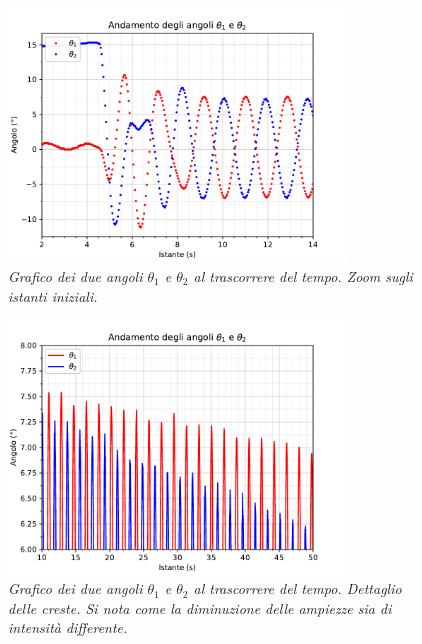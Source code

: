 \documentclass[11pt, a4paper, twoside, italian]{article}
\begin{document}
\begin{figure}[h!]
  \centering
  \includegraphics[width=0.8\textwidth]{../../media/plot/angles_accurate.pdf}
  \caption{\textit{Grafico dei due angoli $\theta_1$ e $\theta_2$ al trascorrere del tempo. Zoom sugli istanti iniziali.} }
  \label{anlges_accurate}
\end{figure}

\begin{figure}[h!]
  \centering
  \includegraphics[width=0.8\textwidth]{../../media/plot/angles_decrease.pdf}
  \caption{\textit{Grafico dei due angoli $\theta_1$ e $\theta_2$
  al trascorrere del tempo. Dettaglio delle creste. Si nota come la diminuzione delle ampiezze
  sia di intensità differente.} }
  \label{angles_decrease}
\end{figure}
\end{document}

